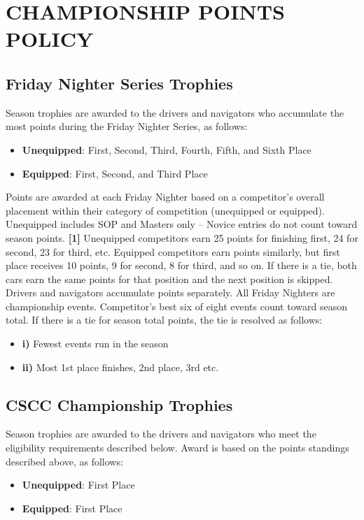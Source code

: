 \section{CHAMPIONSHIP POINTS POLICY}
\subsection{Friday Nighter Series Trophies}
Season trophies are awarded to the drivers and navigators who accumulate the most points during the Friday Nighter Series, as follows:
\begin{itemize}
\item \textbf{Unequipped}: First, Second, Third, Fourth, Fifth, and Sixth Place
\item \textbf{Equipped}: First, Second, and Third Place
\end{itemize}

Points are awarded at each Friday Nighter based on a competitor’s overall placement within their category of competition (unequipped or equipped). Unequipped includes SOP and Masters only – Novice entries do not count toward season points. \textbf{[1]} Unequipped competitors earn 25 points for finishing first, 24 for second, 23 for third, etc. Equipped competitors earn points similarly, but first place receives 10 points, 9 for second, 8 for third, and so on. If there is a tie, both cars earn the same points for that position and the next position is skipped. Drivers and navigators accumulate points separately. All Friday Nighters are championship events. Competitor’s best six of eight events count toward season total. If there is a tie for season total points, the tie is resolved as follows:
\begin{itemize}
\item \textbf{i)} Fewest events run in the season
\item \textbf{ii)} Most 1st place finishes, 2nd place, 3rd etc.
\end{itemize}

\subsection{CSCC Championship Trophies}
Season trophies are awarded to the drivers and navigators who meet the eligibility requirements described below. Award is based on the points standings described above, as follows:
\begin{itemize}
\item \textbf{Unequipped}: First Place
\item \textbf{Equipped}: First Place
\end{itemize}

